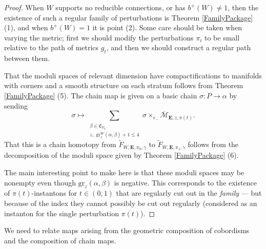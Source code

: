 \documentclass{memo-l}
\theoremstyle{definition}
\theoremstyle{remark}
\numberwithin{section}{chapter}
\numberwithin{equation}{chapter}
\begin{document}
\begin{proof}When $W$ supports no reducible connections, or has $b^+(W) \neq 1$, then the existence of such a regular family of perturbations is Theorem \ref{FamilyPackage} (1), and when $b^+(W) = 1$ it is point (2). Some care should be taken when varying the metric; first we should modify the perturbations $\pi_i$ to be small relative to the path of metrics $g_t$, and then we should construct a regular path between them.

That the moduli spaces of relevant dimension have compactifications to manifolds with corners and a smooth structure on each stratum follows from Theorem \ref{FamilyPackage} (5). The chain map is given on a basic chain $\sigma: P \to \alpha$ by sending $$\sigma \mapsto \sum_{\substack{\beta \in \mathfrak C_{Y_2}\\ z, \text{ gr}^W_z(\alpha, \beta) + 1 \leq 4}} \sigma \times_{e_-} \overline{\mathcal M}_{\mathbf{E}, z,\pi(t)}.$$ That this is a chain homotopy from $\widetilde F_{W,\mathbf{E}, \pi_0, \gamma}$ to $\widetilde F_{W,\mathbf{E}, \pi_1, \gamma}$ follows from the decomposition of the moduli space given by Theorem \ref{FamilyPackage} (6).

The main interesting point to make here is that these moduli spaces may be nonempty even though $\text{gr}_z(\alpha, \beta)$ is negative. This corresponds to the existence of $\pi(t)$-instantons for $t \in (0,1)$ that are regularly cut out in the \textit{family} --- but because of the index they cannot possibly be cut out regularly (considered as an instanton for the single perturbation $\pi(t)$).
\end{proof}

We need to relate maps arising from the geometric composition of cobordisms and the composition of chain maps.
\end{document}
